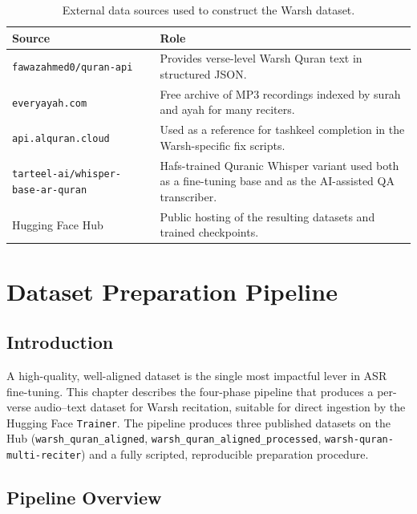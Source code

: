 \documentclass[12pt,a4paper]{report}
\begin{document}
\begin{table}[H]
  \centering
  \caption{External data sources used to construct the Warsh dataset.}
  \label{tab:mt_data_sources}
  \renewcommand{\arraystretch}{1.3}
  \begin{tabular}{lp{9cm}}
    \toprule
    \textbf{Source} & \textbf{Role} \\
    \midrule
    \texttt{fawazahmed0/quran-api}~\cite{fawazapi} & Provides verse-level Warsh Quran text in structured JSON. \\
    \texttt{everyayah.com}~\cite{everyayah} & Free archive of MP3 recordings indexed by surah and ayah for many reciters. \\
    \texttt{api.alquran.cloud}~\cite{alqurancloud} & Used as a reference for tashkeel completion in the Warsh-specific fix scripts. \\
    \texttt{tarteel-ai/whisper-base-ar-quran}~\cite{tarteelmodel} & Hafs-trained Quranic Whisper variant used both as a fine-tuning base and as the AI-assisted QA transcriber. \\
    Hugging Face Hub & Public hosting of the resulting datasets and trained checkpoints. \\
    \bottomrule
  \end{tabular}
\end{table}

\chapter{Dataset Preparation Pipeline}
\label{ch:mt_dataset}

\section{Introduction}
A high-quality, well-aligned dataset is the single most impactful lever in
ASR fine-tuning. This chapter describes the four-phase pipeline that
produces a per-verse audio--text dataset for Warsh recitation, suitable
for direct ingestion by the Hugging Face \texttt{Trainer}. The pipeline
produces three published datasets on the Hub
(\texttt{warsh\_quran\_aligned}, \texttt{warsh\_quran\_aligned\_processed},
\texttt{warsh-quran-multi-reciter}) and a fully scripted, reproducible
preparation procedure.

\section{Pipeline Overview}
\end{document}
